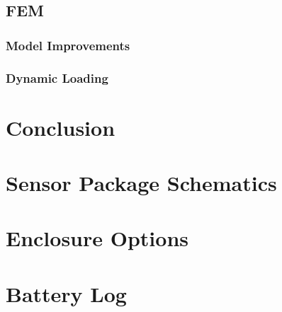 \documentclass[12pt]{report}
\begin{document}
	\section{FEM}
		\subsection{Model Improvements}
		\subsection{Dynamic Loading}
\chapter{Conclusion}




\appendix

\chapter{Sensor Package Schematics}
\label{app:Schematic}


\chapter{Enclosure Options}
\label{app:CaseOptions}


\chapter{Battery Log}
\label{app:batterylog}

 
\end{document}
